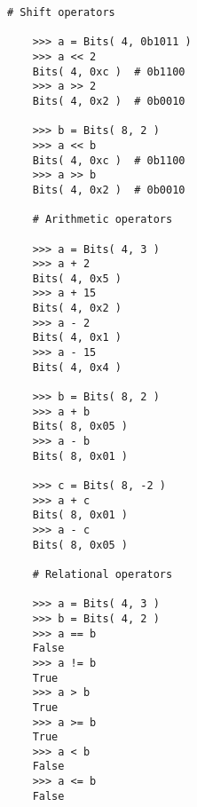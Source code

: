 

  \begin{lstlisting}[gobble=4]
    # Shift operators

    >>> a = Bits( 4, 0b1011 )
    >>> a << 2
    Bits( 4, 0xc )  # 0b1100
    >>> a >> 2
    Bits( 4, 0x2 )  # 0b0010

    >>> b = Bits( 8, 2 )
    >>> a << b
    Bits( 4, 0xc )  # 0b1100
    >>> a >> b
    Bits( 4, 0x2 )  # 0b0010

    # Arithmetic operators

    >>> a = Bits( 4, 3 )
    >>> a + 2
    Bits( 4, 0x5 )
    >>> a + 15
    Bits( 4, 0x2 )
    >>> a - 2
    Bits( 4, 0x1 )
    >>> a - 15
    Bits( 4, 0x4 )

    >>> b = Bits( 8, 2 )
    >>> a + b
    Bits( 8, 0x05 )
    >>> a - b
    Bits( 8, 0x01 )

    >>> c = Bits( 8, -2 )
    >>> a + c
    Bits( 8, 0x01 )
    >>> a - c
    Bits( 8, 0x05 )

    # Relational operators

    >>> a = Bits( 4, 3 )
    >>> b = Bits( 4, 2 )
    >>> a == b
    False
    >>> a != b
    True
    >>> a > b
    True
    >>> a >= b
    True
    >>> a < b
    False
    >>> a <= b
    False
  \end{lstlisting}

  \captionsetup{justification=centering}
  \label{code-tut3-basics-bits-ops2}

